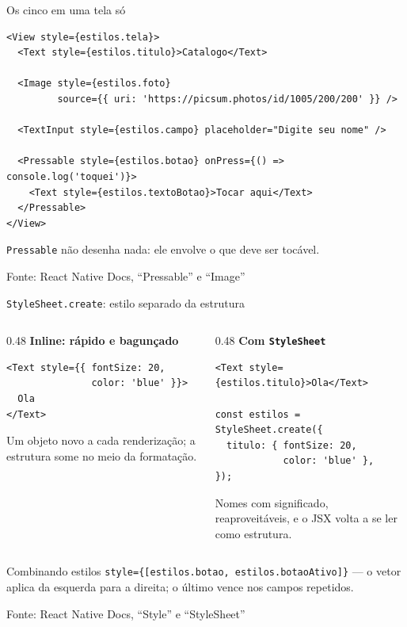 \documentclass[aspectratio=169]{beamer}
\newcommand{\fonte}[1]{\vfill\hfill{\scriptsize\textcolor{UFSGray}{Fonte: #1}}}
\begin{document}
\begin{frame}[fragile]{Os cinco em uma tela só}
\begin{lstlisting}[style=js]
<View style={estilos.tela}>
  <Text style={estilos.titulo}>Catalogo</Text>

  <Image style={estilos.foto}
         source={{ uri: 'https://picsum.photos/id/1005/200/200' }} />

  <TextInput style={estilos.campo} placeholder="Digite seu nome" />

  <Pressable style={estilos.botao} onPress={() => console.log('toquei')}>
    <Text style={estilos.textoBotao}>Tocar aqui</Text>
  </Pressable>
</View>
\end{lstlisting}
  \begin{block}{}
    \texttt{Pressable} não desenha nada: ele envolve o que deve ser tocável.
  \end{block}
  \fonte{React Native Docs, ``Pressable'' e ``Image''~\cite{reactnative2025docs}}
\end{frame}

\begin{frame}[fragile]{\texttt{StyleSheet.create}: estilo separado da estrutura}
  \begin{columns}[T]
    \begin{column}{0.48\textwidth}
      \textbf{Inline: rápido e bagunçado}
\begin{lstlisting}[style=jsx]
<Text style={{ fontSize: 20,
               color: 'blue' }}>
  Ola
</Text>
\end{lstlisting}
      \small Um objeto novo a cada renderização; a estrutura some no meio da
      formatação.
    \end{column}
    \begin{column}{0.48\textwidth}
      \textbf{Com \texttt{StyleSheet}}
\begin{lstlisting}[style=jsx]
<Text style={estilos.titulo}>Ola</Text>

const estilos = StyleSheet.create({
  titulo: { fontSize: 20,
            color: 'blue' },
});
\end{lstlisting}
      \small Nomes com significado, reaproveitáveis, e o JSX volta a se ler
      como estrutura.
    \end{column}
  \end{columns}
  \begin{block}{Combinando estilos}
    \texttt{style=\{[estilos.botao, estilos.botaoAtivo]\}} --- o vetor aplica
    da esquerda para a direita; o último vence nos campos repetidos.
  \end{block}
  \fonte{React Native Docs, ``Style'' e ``StyleSheet''~\cite{reactnative2025docs}}
\end{frame}
\end{document}

